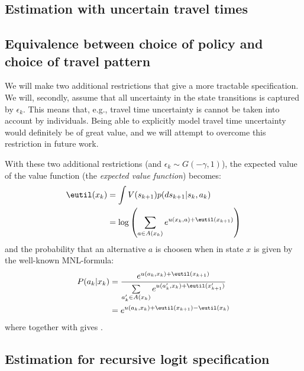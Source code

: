 \subsection{Estimation with uncertain travel times}

\subsection{Equivalence between choice of policy and choice of travel pattern}
We will make two additional restrictions that give a more tractable specification. We will, secondly, assume that all uncertainty in the state transitions is captured by $\epsilon_k$. This means that, e.g., travel time uncertainty is cannot be taken into account by individuals. Being able to explicitly model travel time uncertainty would definitely be of great value, and we will attempt to overcome this restriction in future work. 


With these two additional restrictions (and $\epsilon_k \sim G(-\gamma,1)$), the expected value of the value function (the \emph{expected value function}) becomes:%
\begin{equation} \label{eq:EV}
\begin{aligned}
\eutil(x_k) &= \int V(s_{k+1})p(ds_{k+1}|s_k,a_k) \\&= \log\left(\sum_{a\in A(x_k)}e^{u(x_k,a) + \eutil(x_{k+1})}\right)
\end{aligned}
\end{equation}
and the probability that an alternative $a$ is choosen when in state $x$ is given by the well-known MNL-formula:
\begin{align}
P(a_k|x_k) &= \frac{e^{u(a_k,x_k) + \eutil(x_{k+1})} }{\sum\limits_{a_k'\in A(x_k)} e^{u(a_k',x_k) + \eutil(x_{k+1}')}} \label{eq:MNL} \\
&=e^{u(a_k,x_k) + \eutil(x_{k+1})- \eutil(x_k)}\label{eq:MNLv2}
\end{align}
where  together with  gives .

\subsection{Estimation for recursive logit specification}


